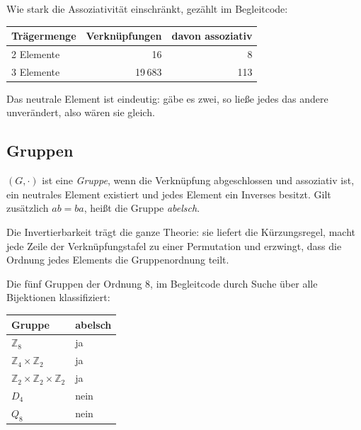 \documentclass[12pt, a4paper]{article}
\begin{document}
\begin{examplebox}
Wie stark die Assoziativität einschränkt, gezählt im Begleitcode:

\begin{center}
\begin{tabular}{lrr}
\toprule
Trägermenge & Verknüpfungen & davon assoziativ\\
\midrule
2 Elemente & 16 & 8\\
3 Elemente & 19\,683 & 113\\
\bottomrule
\end{tabular}
\end{center}
\end{examplebox}

Das neutrale Element ist eindeutig: gäbe es zwei, so ließe jedes das andere
unverändert, also wären sie gleich.

\subsection{Gruppen}

\begin{definitionbox}
$(G, \cdot)$ ist eine \emph{Gruppe}, wenn die Verknüpfung abgeschlossen und
assoziativ ist, ein neutrales Element existiert und jedes Element ein
Inverses besitzt. Gilt zusätzlich $ab = ba$, heißt die Gruppe
\emph{abelsch}.
\end{definitionbox}

Die Invertierbarkeit trägt die ganze Theorie: sie liefert die Kürzungsregel,
macht jede Zeile der Verknüpfungstafel zu einer Permutation und erzwingt,
dass die Ordnung jedes Elements die Gruppenordnung teilt.

\begin{examplebox}
Die fünf Gruppen der Ordnung 8, im Begleitcode durch Suche über alle
Bijektionen klassifiziert:

\begin{center}
\begin{tabular}{ll}
\toprule
Gruppe & abelsch\\
\midrule
$\mathbb{Z}_8$ & ja\\
$\mathbb{Z}_4 \times \mathbb{Z}_2$ & ja\\
$\mathbb{Z}_2 \times \mathbb{Z}_2 \times \mathbb{Z}_2$ & ja\\
$D_4$ & nein\\
$Q_8$ & nein\\
\bottomrule
\end{tabular}
\end{center}
\end{examplebox}
\end{document}
